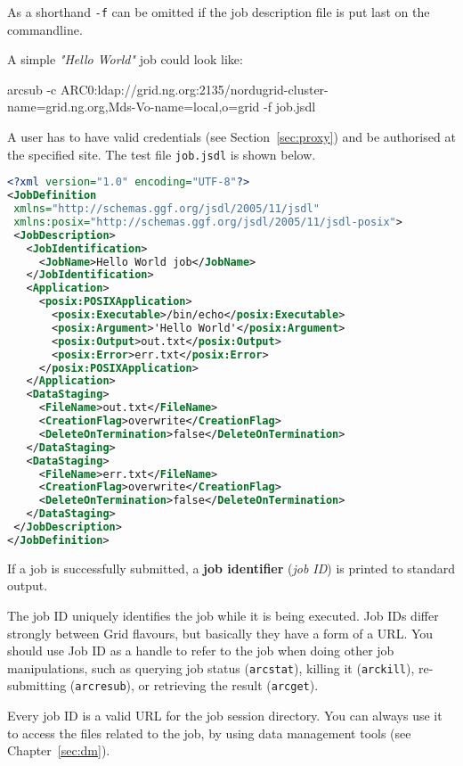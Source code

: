 As a shorthand \texttt{-f} can be omitted if the job description file is put last on the commandline.

A simple \textit{"Hello World"} job could look like:

\begin{shaded}
 arcsub -c ARC0:ldap://grid.ng.org:2135/nordugrid-cluster-name=grid.ng.org,Mds-Vo-name=local,o=grid -f job.jsdl
\end{shaded}

A user has to have valid credentials (see Section~\ref{sec:proxy}) and be authorised at the specified site. The test file \texttt{job.jsdl} is shown below.

\begin{lstlisting}[language=xml]
<?xml version="1.0" encoding="UTF-8"?>
<JobDefinition
 xmlns="http://schemas.ggf.org/jsdl/2005/11/jsdl"
 xmlns:posix="http://schemas.ggf.org/jsdl/2005/11/jsdl-posix">
 <JobDescription>
   <JobIdentification>
     <JobName>Hello World job</JobName>
   </JobIdentification>
   <Application>
     <posix:POSIXApplication>
       <posix:Executable>/bin/echo</posix:Executable>
       <posix:Argument>'Hello World'</posix:Argument>
       <posix:Output>out.txt</posix:Output>
       <posix:Error>err.txt</posix:Error>
     </posix:POSIXApplication>
   </Application>
   <DataStaging>
     <FileName>out.txt</FileName>
     <CreationFlag>overwrite</CreationFlag>
     <DeleteOnTermination>false</DeleteOnTermination>
   </DataStaging>
   <DataStaging>
     <FileName>err.txt</FileName>
     <CreationFlag>overwrite</CreationFlag>
     <DeleteOnTermination>false</DeleteOnTermination>
   </DataStaging>
 </JobDescription>
</JobDefinition>
\end{lstlisting}

\begin{framed}
   If a job is successfully submitted, a \textbf{job identifier}
   (\textit{job ID}) is printed to standard output.
\end{framed}

The job ID uniquely identifies the job while it is being executed. Job IDs
differ strongly between Grid flavours, but basically they have a form of a URL.
You should use Job ID as a handle to refer to the job when doing other
job manipulations, such as querying job status (\verb#arcstat#),
killing it (\verb#arckill#), re-submitting (\verb#arcresub#), or
retrieving the result (\verb#arcget#).

\begin{framed}
   Every job ID is a valid URL for the job session directory. You can
   always use it to access the files related to the job, by using data
   management tools (see Chapter~\ref{sec:dm}).
\end{framed}

